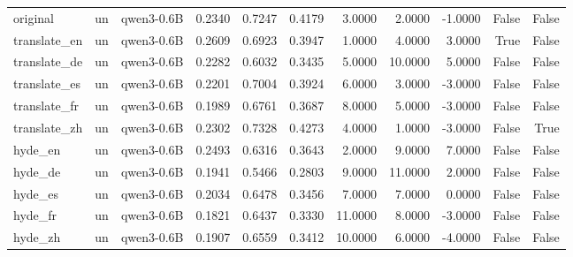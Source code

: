 \begin{tabular}{lllrrrrrrrr}
original & un & qwen3-0.6B & 0.2340 & 0.7247 & 0.4179 & 3.0000 & 2.0000 & -1.0000 & False & False \\
translate\_en & un & qwen3-0.6B & 0.2609 & 0.6923 & 0.3947 & 1.0000 & 4.0000 & 3.0000 & True & False \\
translate\_de & un & qwen3-0.6B & 0.2282 & 0.6032 & 0.3435 & 5.0000 & 10.0000 & 5.0000 & False & False \\
translate\_es & un & qwen3-0.6B & 0.2201 & 0.7004 & 0.3924 & 6.0000 & 3.0000 & -3.0000 & False & False \\
translate\_fr & un & qwen3-0.6B & 0.1989 & 0.6761 & 0.3687 & 8.0000 & 5.0000 & -3.0000 & False & False \\
translate\_zh & un & qwen3-0.6B & 0.2302 & 0.7328 & 0.4273 & 4.0000 & 1.0000 & -3.0000 & False & True \\
hyde\_en & un & qwen3-0.6B & 0.2493 & 0.6316 & 0.3643 & 2.0000 & 9.0000 & 7.0000 & False & False \\
hyde\_de & un & qwen3-0.6B & 0.1941 & 0.5466 & 0.2803 & 9.0000 & 11.0000 & 2.0000 & False & False \\
hyde\_es & un & qwen3-0.6B & 0.2034 & 0.6478 & 0.3456 & 7.0000 & 7.0000 & 0.0000 & False & False \\
hyde\_fr & un & qwen3-0.6B & 0.1821 & 0.6437 & 0.3330 & 11.0000 & 8.0000 & -3.0000 & False & False \\
hyde\_zh & un & qwen3-0.6B & 0.1907 & 0.6559 & 0.3412 & 10.0000 & 6.0000 & -4.0000 & False & False \\
\bottomrule
\end{tabular}
